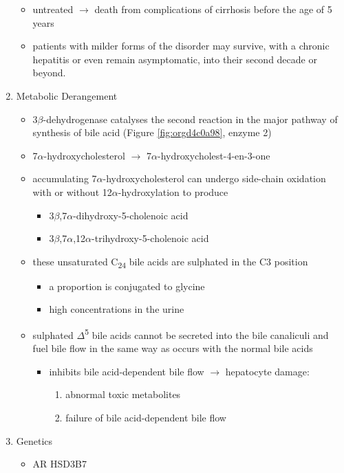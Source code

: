 \documentclass[12pt]{scrartcl}
\begin{document}
\begin{enumerate}
\begin{itemize}
\item untreated \(\to\) death from complications of cirrhosis before the age
of 5 years
\item patients with milder forms of the disorder may survive, with a
chronic hepatitis or even remain asymptomatic, into their second
decade or beyond.
\end{itemize}
\item Metabolic Derangement
\label{sec:org05be9e3}
\begin{itemize}
\item 3\(\beta\)-dehydrogenase catalyses the second reaction in the major
pathway of synthesis of bile acid (Figure \ref{fig:orgd4c0a98}, enzyme 2)
\item 7\(\alpha\)-hydroxycholesterol \(\to\) 7\(\alpha\)-hydroxycholest-4-en-3-one
\item accumulating 7\(\alpha\)-hydroxycholesterol can undergo side-chain
oxidation with or without 12\(\alpha\)-hydroxylation to produce
\begin{itemize}
\item 3\(\beta\),7\(\alpha\)-dihydroxy-5-cholenoic acid
\item 3\(\beta\),7\(\alpha\),12\(\alpha\)-trihydroxy-5-cholenoic acid
\end{itemize}
\item these unsaturated C\textsubscript{24} bile acids are sulphated in the C3 position
\begin{itemize}
\item a proportion is conjugated to glycine
\item high concentrations in the urine
\end{itemize}
\item sulphated \(\Delta\)\textsuperscript{5} bile acids cannot be secreted into the bile
canaliculi and fuel bile flow in the same way as occurs with the
normal bile acids
\begin{itemize}
\item inhibits bile acid-dependent bile flow \(\to\) hepatocyte damage:
\begin{enumerate}
\item abnormal toxic metabolites
\item failure of bile acid-dependent bile flow
\end{enumerate}
\end{itemize}
\end{itemize}

\item Genetics
\label{sec:org53acf49}
\begin{itemize}
\item AR HSD3B7
\end{itemize}


\end{enumerate}
\end{document}
